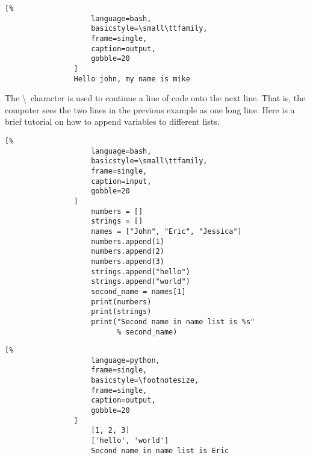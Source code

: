 \documentclass[crop=false,class=article,oneside]{standalone}
\begin{document}
            \begin{minipage}[t]{.48\textwidth}
                \centering
                \begin{lstlisting}[%
                    language=bash,
                    basicstyle=\small\ttfamily,
                    frame=single,
                    caption=output,
                    gobble=20
                ]
                Hello john, my name is mike
                \end{lstlisting}
            \end{minipage}
            The \textbackslash\ character is used to continue a line
            of code onto the next line. That is, the computer sees
            the two lines in the previous example as one long line.
            Here is a brief tutorial on how to append variables to
            different lists.\newline
            \begin{minipage}[t]{.48\textwidth}
                \centering
                \begin{lstlisting}[%
                    language=bash,
                    basicstyle=\small\ttfamily,
                    frame=single,
                    caption=input,
                    gobble=20
                ]
                    numbers = []
                    strings = []
                    names = ["John", "Eric", "Jessica"]
                    numbers.append(1)
                    numbers.append(2)
                    numbers.append(3)
                    strings.append("hello")
                    strings.append("world")
                    second_name = names[1]
                    print(numbers)
                    print(strings)
                    print("Second name in name list is %s"
                          % second_name)
                \end{lstlisting}
            \end{minipage}\hfill
            \begin{minipage}[t]{.48\textwidth}
                \centering
                \begin{lstlisting}[%
                    language=python,
                    frame=single,
                    basicstyle=\footnotesize,
                    frame=single,
                    caption=output,
                    gobble=20
                ]
                    [1, 2, 3]
                    ['hello', 'world']
                    Second name in name list is Eric
                \end{lstlisting}
            \end{minipage}
            \newpage
\end{document}
